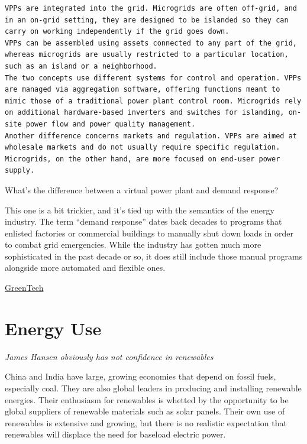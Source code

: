 \documentclass[
]{book}
\begin{document}
\begin{verbatim}
VPPs are integrated into the grid. Microgrids are often off-grid, and in an on-grid setting, they are designed to be islanded so they can carry on working independently if the grid goes down. 
VPPs can be assembled using assets connected to any part of the grid, whereas microgrids are usually restricted to a particular location, such as an island or a neighborhood. 
The two concepts use different systems for control and operation. VPPs are managed via aggregation software, offering functions meant to mimic those of a traditional power plant control room. Microgrids rely on additional hardware-based inverters and switches for islanding, on-site power flow and power quality management. 
Another difference concerns markets and regulation. VPPs are aimed at wholesale markets and do not usually require specific regulation. Microgrids, on the other hand, are more focused on end-user power supply. 
\end{verbatim}

What's the difference between a virtual power plant and demand response?

This one is a bit trickier, and it's tied up with the semantics of the energy industry. The term ``demand response'' dates back decades to programs that enlisted factories or commercial buildings to manually shut down loads in order to combat grid emergencies. While the industry has gotten much more sophisticated in the past decade or so, it does still include those manual programs alongside more automated and flexible ones.

\href{https://www.greentechmedia.com/articles/read/so-what-exactly-are-virtual-power-plants}{GreenTech}

\hypertarget{energy-use}{%
\chapter{Energy Use}\label{energy-use}}

\emph{James Hansen obviously has not confidence in renewables}

China and India have large, growing economies that depend on fossil fuels, especially coal.
They are also global leaders in producing and installing renewable energies. Their enthusiasm
for renewables is whetted by the opportunity to be global suppliers of renewable materials such
as solar panels. Their own use of renewables is extensive and growing, but there is no realistic
expectation that renewables will displace the need for baseload electric power.
\end{document}
